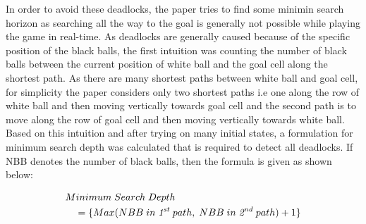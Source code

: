 \documentclass[letterpaper]{article}
\begin{document}
In order to avoid these deadlocks, the paper tries to find some minimin search horizon as searching all the way to the goal is generally not possible while playing the game in real-time. As deadlocks are generally caused because of the specific position of the black balls, the first intuition was counting the number of black balls between the current position of white ball and the goal cell along the shortest path. As there are many shortest paths between white ball and goal cell, for simplicity the paper considers only two shortest paths i.e one along the row of white ball and then moving vertically towards goal cell and the second path is to move along the row of goal cell and then moving vertically towards white ball. Based on this intuition and after trying on many initial states, a formulation for minimum search depth was calculated that is required to detect all deadlocks. If NBB denotes the number of black balls, then the formula is given as shown below:

\begin{equation}
\begin{multlined}
Minimum\;Search\;Depth \\
= \{Max(NBB\;in\;\emph{1\textsuperscript{st}}\;path , \;NBB\;in\; \emph{2\textsuperscript{nd}}\;path) + 1 \}
\end{multlined}
\label{eq:Minimin_Search_Horizon}
\end{equation}
\end{document}
